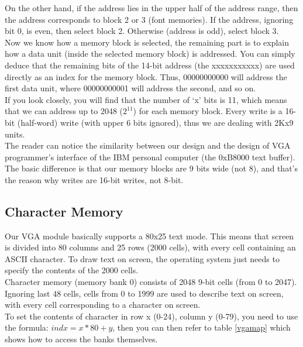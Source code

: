 \documentclass[oneside]{book}
\begin{document}
On the other hand, if the address lies in the upper half of the address range,
then the address corresponds to block 2 or 3 (font memories). If the address,
ignoring bit 0, is even, then select block 2. Otherwise (address is odd),
select block 3. \\

Now we know how a memory block is selected, the remaining part is to explain
how a data unit (inside the selected memory block) is addressed. You can
simply deduce that the remaining bits of the 14-bit address (the xxxxxxxxxxx)
are used directly as an index for the memory block. Thus, 00000000000 will
address the first data unit, where 00000000001 will address the second,
and so on. \\

If you look closely, you will find that the number of `x' bits is 11,
which means that we can address up to 2048 ($2^{11}$) for each memory
block. Every write is a 16-bit (half-word) write (with upper 6 bits
ignored), thus we are dealing with 2Kx9 units.\\

The reader can notice the similarity between our design and the design
of VGA programmer's interface of the IBM personal computer (the 0xB8000 text
buffer). The basic difference is that our memory blocks are 9 bits wide
(not 8), and that's the reason why writes are 16-bit writes, not 8-bit.

\subsection{Character Memory}

Our VGA module basically supports a 80x25 text mode. This means that screen
is divided into 80 columns and 25 rows (2000 cells), with every cell
containing an ASCII character. To draw text on screen, the operating system
just needs to specify the contents of the 2000 cells.\\

Character memory (memory bank 0) consists of 2048 9-bit cells (from 0
to 2047). Ignoring last 48 cells, cells from 0 to 1999 are used to describe
text on screen, with every cell corresponding to a character on screen.\\

To set the contents of character in row x (0-24), column y (0-79), you
need to use the formula: $indx=x*80+y$, then you can then refer to table
\ref{vgamap} which shows how to access the banks themselves.\\
\end{document}

